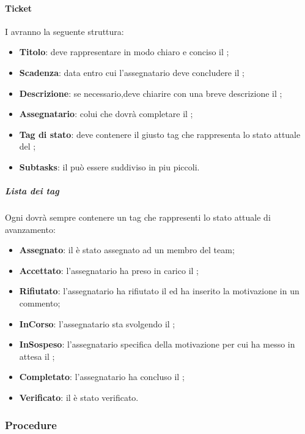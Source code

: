 	\paragraph{Ticket}
	\label{sec:4.1.1.3}
		I  avranno la seguente struttura:
		\begin{itemize}
		 	\item \textbf{Titolo}: deve rappresentare in modo chiaro e conciso il ;
		 	\item \textbf{Scadenza}: data entro cui l'assegnatario deve concludere il ;
		 	\item \textbf{Descrizione}: se necessario,deve chiarire con una breve descrizione il ;
		 	\item \textbf{Assegnatario}: colui che dovrà completare il ;
		 	\item \textbf{Tag di stato}: deve contenere il giusto tag che rappresenta lo stato attuale del ; 
		 	\item \textbf{Subtasks}: il  può essere suddiviso in  piu piccoli.
		 	\end{itemize}
	 	\subparagraph{Lista dei tag}
	 	\label{sec:4.1.1.3.1}
		 	Ogni  dovrà sempre contenere un tag che rappresenti lo stato attuale di avanzamento:
		 	\begin{itemize}
		 		\item \textbf{Assegnato}: il  è stato assegnato ad un membro del team;
		 		\item \textbf{Accettato}: l'assegnatario ha preso in carico il ;
		 		\item \textbf{Rifiutato}: l'assegnatario ha rifiutato il  ed ha inserito la motivazione in un commento;
		 		\item \textbf{InCorso}: l'assegnatario sta svolgendo il ;
		 		\item \textbf{InSospeso}: l'assegnatario specifica della motivazione per cui ha messo in attesa il ;
		 		\item \textbf{Completato}: l'assegnatario ha concluso il ;
		 		\item \textbf{Verificato}: il  è stato verificato.
		 		\end{itemize}
\subsubsection{Procedure}
\label{sec:4.1.2}
